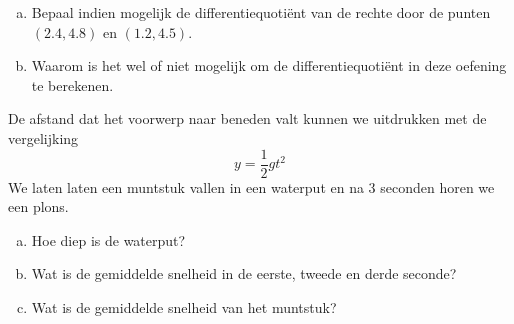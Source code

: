 \documentclass[12pt]{article}
\begin{document}
\begin{oefening}
\begin{enumerate}[(a)]
  \item Bepaal indien mogelijk de differentiequotiënt van de rechte door de punten $(2.4,4.8)$ en $(1.2,4.5)$.
  \item Waarom is het wel of niet mogelijk om de differentiequotiënt in deze oefening te berekenen.\end{enumerate}
\end{oefening}

\begin{oefening}
De afstand dat het voorwerp naar beneden valt kunnen we uitdrukken met de vergelijking
$$y=\dfrac{1}{2}gt^2$$
We laten laten een muntstuk vallen in een waterput en na 3 seconden horen we een plons.
\begin{enumerate}[(a)]
  \item Hoe diep is de waterput?
  \item Wat is de gemiddelde snelheid in de eerste, tweede en derde seconde?
  \item Wat is de gemiddelde snelheid van het muntstuk?
\end{enumerate}
\end{oefening}
\end{document}

